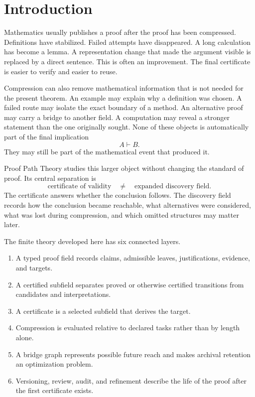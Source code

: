 \documentclass[11pt,oneside]{article}
\theoremstyle{definition}
\theoremstyle{remark}
\begin{document}
\tableofcontents
\newpage

\section{Introduction}

Mathematics usually publishes a proof after the proof has been compressed. Definitions have stabilized. Failed attempts have disappeared. A long calculation has become a lemma. A representation change that made the argument visible is replaced by a direct sentence. This is often an improvement. The final certificate is easier to verify and easier to reuse.

Compression can also remove mathematical information that is not needed for the present theorem. An example may explain why a definition was chosen. A failed route may isolate the exact boundary of a method. An alternative proof may carry a bridge to another field. A computation may reveal a stronger statement than the one originally sought. None of these objects is automatically part of the final implication
\[
A\vdash B.
\]
They may still be part of the mathematical event that produced it.

Proof Path Theory studies this larger object without changing the standard of proof. Its central separation is
\[
\boxed{
\text{certificate of validity}
\quad\ne\quad
\text{expanded discovery field}.
}
\]
The certificate answers whether the conclusion follows. The discovery field records how the conclusion became reachable, what alternatives were considered, what was lost during compression, and which omitted structures may matter later.

The finite theory developed here has six connected layers.

\begin{enumerate}
\item A typed proof field records claims, admissible leaves, justifications, evidence, and targets.
\item A certified subfield separates proved or otherwise certified transitions from candidates and interpretations.
\item A certificate is a selected subfield that derives the target.
\item Compression is evaluated relative to declared tasks rather than by length alone.
\item A bridge graph represents possible future reach and makes archival retention an optimization problem.
\item Versioning, review, audit, and refinement describe the life of the proof after the first certificate exists.
\end{enumerate}
\end{document}
